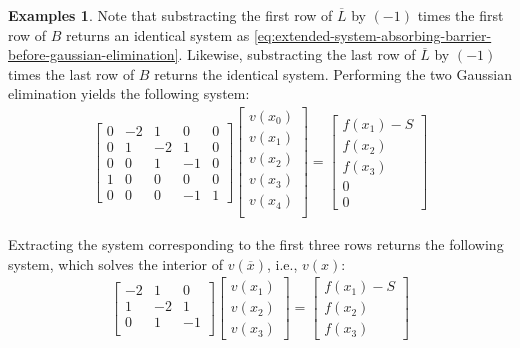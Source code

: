 \documentclass[11pt]{article}
\theoremstyle{definition}
\newtheorem{example}{Examples}[section]
\begin{document}
\begin{example}
	Note that substracting the first row of $\overline{L}$ by $(-1)$ times the first row of $B$ returns an identical system as \eqref{eq:extended-system-absorbing-barrier-before-gaussian-elimination}. Likewise, substracting the last row of $\overline{L}$ by $(-1)$ times the last row of $B$ returns the identical system. Performing the two Gaussian elimination yields the following system:
	\begin{align}\label{eq:extended-system-absorbing-barrier-after-gaussian-elimination}
	\begin{bmatrix}
	0 & -2 & 1 & 0 & 0 \\
	0 & 1 & -2 & 1 & 0 \\
	0 & 0 & 1 & -1 & 0 \\
	1 & 0  & 0 & 0 & 0 \\
	0 & 0 & 0 & -1 & 1
	\end{bmatrix} 	  \begin{bmatrix}
	v(x_0) \\
	v(x_1) \\
	v(x_2) \\
	v(x_3) \\
	v(x_4) \\
	\end{bmatrix}
	= 
	\begin{bmatrix}
	f(x_1) - S \\
	f(x_2) \\
	f(x_3) \\
	0 \\
	0 
	\end{bmatrix} 
	\end{align}
	
	Extracting the system corresponding to the first three rows returns the following system, which solves the interior of $v(\overline{x})$, i.e., $v(x)$:
	\begin{align}
	\begin{bmatrix}
	-2 & 1 & 0  \\
	1 & -2 & 1 \\
	0 & 1 & -1 \\
	\end{bmatrix} 	  \begin{bmatrix}
	v(x_1) \\
	v(x_2) \\
	v(x_3) 
	\end{bmatrix}
	= 
	\begin{bmatrix}
	f(x_1) - S \\
	f(x_2) \\
	f(x_3) 
	\end{bmatrix} 
	\end{align}
\end{example}
\end{document}
